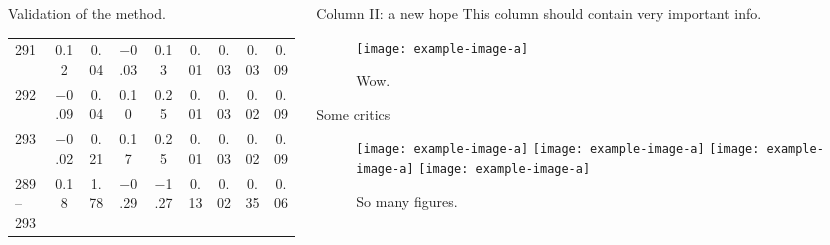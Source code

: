 \begin{frame}[t]
\begin{columns}[t]
\begin{column}{\colwidth}
\begin{block}{Validation of the method.}
\begin{table}
\begin{center}
\begin{tabular}{@{} l c c c c c c c c @{}}
							291           & \alert{\num{ 0.12}}                                                   & \alert{\num{0.04}}               & \num{-0.03}                    & \num{0.13}                       & \num{0.01}         & \num{0.03}         & \num{0.03}         & \num{0.09}         \\
							292           & \alert{\num{-0.09}}                                                   & \alert{\num{0.04}}               & \num{ 0.10}                    & \num{0.25}                       & \num{0.01}         & \num{0.03}         & \num{0.02}         & \num{0.09}         \\
							293           & \num{-0.02}                                                           & \num{0.21}                       & \num{ 0.17}                    & \num{0.25}                       & \num{0.01}         & \num{0.03}         & \num{0.02}         & \num{0.09}         \\
							289--293      & \num{ 0.18}                                                           & \num{1.78}                       & \num{-0.29}                    & \num{-1.27}                      & \alert{\num{0.13}} & \alert{\num{0.02}} & \alert{\num{0.35}} & \alert{\num{0.06}} \\
							\bottomrule
						\end{tabular}
					\end{center}
				\end{table}
			\end{block}

		\end{column}
		\separatorcolumn
		\begin{column}{\colwidth}
			\begin{block}{Column II: a new hope}
				This column should contain \alert{very important} info.
				\begin{figure}
					\centering
					\texttt{[image: example-image-a]}
					\caption{%
						Wow.
					}
				\end{figure}
			\end{block}

			\begin{block}{Some critics}
				\begin{figure}
					\centering
					\texttt{[image: example-image-a]}
					\texttt{[image: example-image-a]}
					\texttt{[image: example-image-a]}
					\texttt{[image: example-image-a]}
					\caption{%
						So many figures.
					}
				\end{figure}


\end{block}
\end{column}
\end{columns}
\end{frame}
